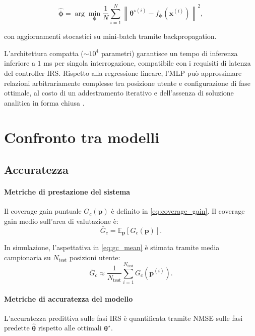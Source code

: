 \documentclass[12pt,a4paper]{report}
\begin{document}
\begin{equation}
  \hat{\boldsymbol{\phi}} =
  \arg\min_{\boldsymbol{\phi}}
  \frac{1}{N}\sum_{i=1}^{N}
  \left\|\boldsymbol{\theta}^{\star(i)} -
  f_{\boldsymbol{\phi}}\!\left(\mathbf{x}^{(i)}\right)\right\|^2,
  \label{eq:mlp_loss}
\end{equation}

con aggiornamenti stocastici su mini-batch tramite backpropagation.

\noindent L'architettura compatta ($\sim 10^4$ parametri) garantisce
un tempo di inferenza inferiore a $1$ ms per singola interrogazione,
compatibile con i requisiti di latenza del controller IRS. Rispetto
alla regressione lineare, l'MLP può approssimare relazioni
arbitrariamente complesse tra posizione utente e configurazione di
fase ottimale, al costo di un addestramento iterativo e dell'assenza
di soluzione analitica in forma chiusa \cite{goodfellow2016dl}.

\section{Confronto tra modelli}
\subsection{Accuratezza}
\paragraph{Metriche di prestazione del sistema}
Il coverage gain puntuale $G_c(\mathbf{p})$ \`e definito in
\eqref{eq:coverage_gain}. Il coverage gain medio sull'area di valutazione \`e:
\begin{equation}
  \bar{G}_c = \mathbb{E}_{\mathbf{p}}\left[G_c(\mathbf{p})\right].
  \label{eq:gc_mean}
\end{equation}

In simulazione, l'aspettativa in \eqref{eq:gc_mean} \`e stimata
tramite media campionaria su $N_{\text{test}}$ posizioni utente:
\begin{equation}
  \bar{G}_c \approx \frac{1}{N_{\text{test}}}
  \sum_{i=1}^{N_{\text{test}}} G_c\!\left(\mathbf{p}^{(i)}\right).
  \label{eq:gc_mean_empirical}
\end{equation}

\paragraph{Metriche di accuratezza del modello}
L'accuratezza predittiva sulle fasi IRS \`e quantificata tramite NMSE
sulle fasi predette $\hat{\boldsymbol{\theta}}$ rispetto alle
ottimali $\boldsymbol{\theta}^\star$.
\end{document}
